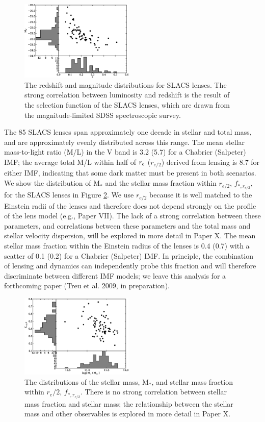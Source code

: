 \documentclass[iop]{emulateapj}
\begin{document}
\begin{figure}[ht]
 \centering
 \includegraphics[width=0.48\textwidth,clip]{f8.eps}
 \caption{The redshift and magnitude distributions for SLACS lenses. The strong correlation between luminosity and redshift is the result of the selection function of the SLACS lenses, which are drawn from the magnitude-limited SDSS spectroscopic survey.}
 \label{F_redshift_mag}
\end{figure}

The 85 SLACS lenses span approximately one decade in stellar and total mass, and are approximately evenly distributed across this range. The mean stellar mass-to-light ratio (M/L) in the V band is 3.2 (5.7) for a Chabrier (Salpeter) IMF; the average total M/L within half of $r_{\rm e}$ ($r_{e/2}$) derived from lensing is 8.7 for either IMF, indicating that some dark matter must be present in both scenarios. We show the distribution of M$_*$ and the stellar mass fraction within $r_{e/2}$, $f_{*,r_{e/2}}$, for the SLACS lenses in Figure \ref{F_stellar_masses}. We use $r_{e/2}$ because it is well matched to the Einstein radii of the lenses and therefore does not depend strongly on the profile of the lens model (e.g., Paper VII). The lack of a strong correlation between these parameters, and correlations between these parameters and the total mass and stellar velocity dispersion, will be explored in more detail in Paper X. The mean stellar mass fraction within the Einstein radius of the lenses is 0.4 (0.7) with a scatter of 0.1 (0.2) for a Chabrier (Salpeter) IMF. In principle, the combination of lensing and dynamics can independently probe this fraction and will therefore discriminate between different IMF models; we leave this analysis for a forthcoming paper (Treu et al. 2009, in preparation).


\begin{figure}[ht]
 \centering
 \includegraphics[width=0.48\textwidth,clip]{f9.eps}
 \caption{The distributions of the stellar mass, M$_*$, and stellar mass fraction within $r_e/2$, $f_{*,r_{e/2}}$. There is no strong correlation between stellar mass fraction and stellar mass; the relationship between the stellar mass and other observables is explored in more detail in Paper X.}
 \label{F_stellar_masses}
\end{figure}
\end{document}
